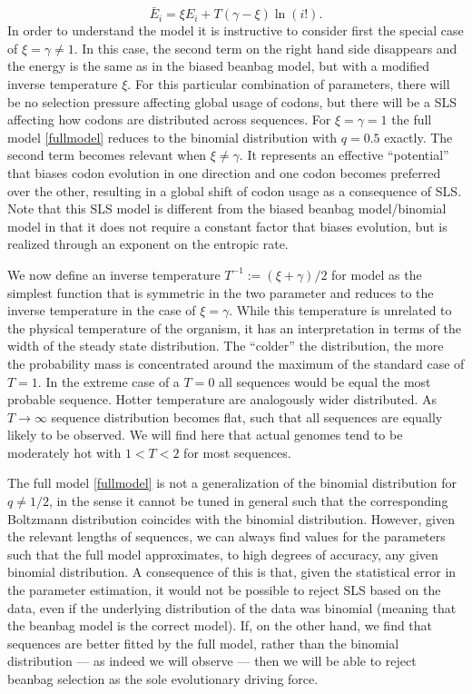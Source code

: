 \documentclass[a4paper,10pt]{paper}%
\begin{document}
%
% 
\begin{equation}
\bar E_i= \xi E_i +  T (\gamma - \xi) \ln(i!).
\label{fullmodel}
\end{equation}
%
%
In order to understand the model it is instructive to consider first the special case of  $\xi=\gamma\neq 1$. In this case, the  second term on the right hand side disappears and the   energy is the same as in the biased beanbag model, but with a modified inverse temperature $\xi$. For this particular combination of parameters, there will be no selection pressure affecting global usage of codons, but  there will be a SLS  affecting how codons are distributed across sequences. For $\xi=\gamma = 1$ the full model  \ref{fullmodel}  reduces to  the binomial distribution  with $q=0.5$ exactly.  The second term becomes relevant when $\xi\neq\gamma$. It represents an effective ``potential'' that biases codon evolution in one direction and   one codon becomes preferred over the other, resulting in a global shift of codon usage as a consequence of SLS. Note that this SLS model is different from the biased beanbag model/binomial model in that it does not require a constant factor that biases evolution, but is realized through an exponent  on the entropic rate.  
\par
We  now define an inverse temperature $T^{-1} :=(\xi + \gamma)/2$ for  model as  the simplest function that is  symmetric in the two parameter  and reduces to the inverse temperature in the case of $\xi = \gamma$. While this temperature is unrelated to the physical temperature of the organism, it has an interpretation in terms of the width of the steady state distribution. The ``colder'' the distribution, the more  the probability mass is concentrated around the maximum of the standard case of $T=1$. In the extreme case of a $T=0$ all sequences would be equal the most probable sequence. Hotter temperature are analogously wider distributed. As $T\to\infty$ sequence distribution becomes flat, such that all sequences are equally likely to be observed. We will find here that actual genomes tend to be moderately hot with $1<T<2$ for most sequences.  
\par
The full model \ref{fullmodel} is not a generalization of the binomial distribution for $q\neq 1/2$, in the sense it cannot be  tuned  in general such that the corresponding Boltzmann distribution   coincides with the binomial distribution. However, given the relevant lengths of sequences,  we can always find values  for the  parameters such that the full model approximates, to high degrees of accuracy, any given  binomial distribution.    A consequence of this is that, given the statistical error in the parameter estimation,  it would not be possible to reject SLS based on the data, even if the underlying distribution of the data was binomial  (meaning that the beanbag model is the correct model).    If, on the other hand,  we find that sequences are better fitted by the full model, rather than the  binomial distribution --- as indeed we will observe ---  then we will be able to reject  beanbag selection as the sole evolutionary driving force. 
\end{document}
